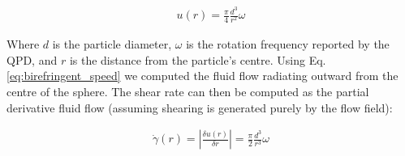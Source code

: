 \begin{align}
	\label{eq:birefringent_speed}
	u(r) = \frac{\pi}{4}\frac{d^3}{r^2}\omega
\end{align}

Where $d$ is the particle diameter, $\omega$ is the rotation frequency reported by the QPD, and $r$ is the distance from the particle's centre. Using Eq.\ref{eq:birefringent_speed} we computed the fluid flow radiating outward from the centre of the sphere. The shear rate can then be computed as the partial derivative fluid flow (assuming shearing is generated purely by the flow field):

\begin{align}
	\label{eq:birefringent_shear}
	\dot{\gamma}(r)=\left|\frac{\delta u(r)}{\delta r} \right|= \frac{\pi}{2}\frac{d^3}{r^3}\omega
\end{align}

